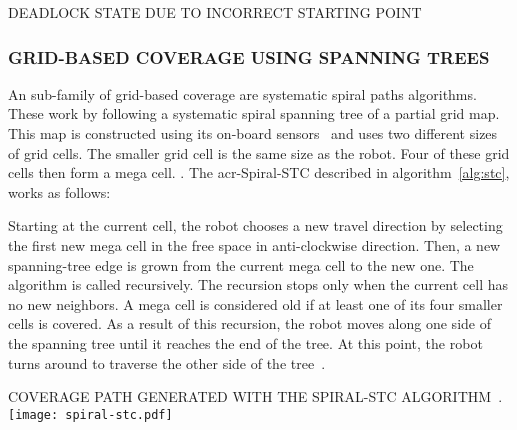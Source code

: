 \begin{RoyalFigure}[!htb, label=fig:deadlock]{DEADLOCK STATE DUE TO INCORRECT STARTING POINT}
\end{RoyalFigure}

\subsubsection{GRID-BASED COVERAGE USING SPANNING TREES}
An sub-family of grid-based coverage are systematic spiral paths algorithms. These work by following a systematic spiral
spanning tree of a partial grid map. This map is constructed using its on-board sensors~\cite{galceran_coverage_2014}
and uses two different sizes of grid cells. The smaller grid cell is the same size as the robot. Four of these grid
cells then form a mega cell. \cite{wong_qualitative_2006}. The \gls{acr-Spiral-STC} described in
algorithm~\ref{alg:stc}, works as follows:

Starting at the current cell, the robot chooses a new travel direction by selecting the first new mega cell in the free
space in anti-clockwise direction. Then, a new spanning-tree edge is grown from the current mega cell to the new one.
The algorithm is called recursively. The recursion stops only when the current cell has no new neighbors. A mega cell is
considered old if at least one of its four smaller cells is covered. As a result of this recursion, the robot moves
along one side of the spanning tree until it reaches the end of the tree. At this point, the robot turns around to
traverse the other side of the tree~\cite{galceran_coverage_2014}.

\begin{RoyalFigure}[!htb, label=]{COVERAGE PATH GENERATED WITH THE SPIRAL-STC ALGORITHM~\cite{galceran_survey_2013}.}
		\texttt{[image: spiral-stc.pdf]}
\end{RoyalFigure}

